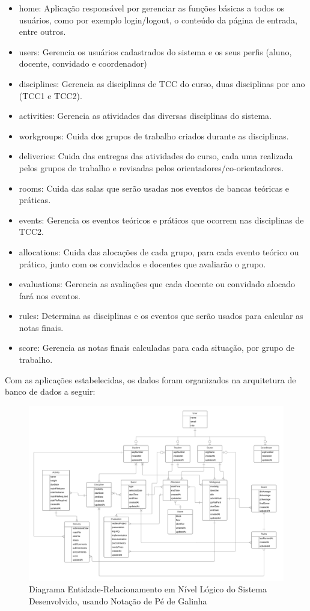 \begin{itemize}
    \item home: Aplicação responsável por gerenciar as funções básicas a todos os usuários, como por exemplo login/logout, o conteúdo da página de entrada, entre outros.
    \item users: Gerencia os usuários cadastrados do sistema e os seus perfis (aluno, docente, convidado e coordenador)
    \item disciplines: Gerencia as disciplinas de TCC do curso, duas disciplinas por ano (TCC1 e TCC2).
    \item activities: Gerencia as atividades das diversas disciplinas do sistema.
    \item workgroups: Cuida dos grupos de trabalho criados durante as disciplinas. 
    \item deliveries: Cuida das entregas das atividades do curso, cada uma realizada pelos grupos de trabalho e revisadas pelos orientadores/co-orientadores.
    \item rooms: Cuida das salas que serão usadas nos eventos de bancas teóricas e práticas.
    \item events: Gerencia os eventos teóricos e práticos que ocorrem nas disciplinas de TCC2.
    \item allocations: Cuida das alocações de cada grupo, para cada evento teórico ou prático, junto com os convidados e docentes que avaliarão o grupo.
    \item evaluations: Gerencia as avaliações que cada docente ou convidado alocado fará nos eventos.
    \item rules: Determina as disciplinas e os eventos que serão usados para calcular as notas finais.
    \item score: Gerencia as notas finais calculadas para cada situação, por grupo de trabalho.
\end{itemize}

Com as aplicações estabelecidas, os dados foram organizados na arquitetura de banco de dados a seguir:

\begin{figure}[H]
    \centering
    \includegraphics[angle=90, origin=c, scale=0.65]{imagens/erd.png}
    \caption{Diagrama Entidade-Relacionamento em Nível Lógico do Sistema Desenvolvido, usando Notação de Pé de Galinha}
    \label{fig:erd}
\end{figure}

